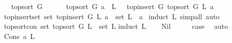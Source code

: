 \begin{isabellebody}
\ \ \ {\isachardoublequoteopen}top{\isacharunderscore}{\kern0pt}sort\ G\ {\isacharbrackleft}{\kern0pt}{\isacharbrackright}{\kern0pt}{\isacharequal}{\kern0pt}\ {\isacharbrackleft}{\kern0pt}{\isacharbrackright}{\kern0pt}\ {\isachardoublequoteclose}\isanewline
\ \ {\isacharbar}{\kern0pt}\ {\isachardoublequoteopen}top{\isacharunderscore}{\kern0pt}sort\ G\ {\isacharparenleft}{\kern0pt}a\ {\isacharhash}{\kern0pt}\ L{\isacharparenright}{\kern0pt}\ {\isacharequal}{\kern0pt}\ \ top{\isacharunderscore}{\kern0pt}insert\ G\ {\isacharparenleft}{\kern0pt}top{\isacharunderscore}{\kern0pt}sort\ G\ L{\isacharparenright}{\kern0pt}\ a{\isachardoublequoteclose}%
\isadelimdocument
%
\endisadelimdocument
%
\isatagdocument
%
\isamarkuptrue%
%
\endisatagdocument
{\isafolddocument}%
%
\isadelimdocument
%
\endisadelimdocument
{}\isamarkupfalse%
\ top{\isacharunderscore}{\kern0pt}insert{\isacharunderscore}{\kern0pt}set{\isacharcolon}{\kern0pt}\ {\isachardoublequoteopen}set\ {\isacharparenleft}{\kern0pt}top{\isacharunderscore}{\kern0pt}insert\ G\ L\ a{\isacharparenright}{\kern0pt}\ {\isacharequal}{\kern0pt}\ set\ L\ {\isasymunion}\ {\isacharbraceleft}{\kern0pt}a{\isacharbraceright}{\kern0pt}{\isachardoublequoteclose}\ \isanewline
%
\isadelimproof
%
\endisadelimproof
%
\isatagproof
{}\isamarkupfalse%
{\isacharparenleft}{\kern0pt}induct\ L{\isacharcomma}{\kern0pt}\ simp{\isacharunderscore}{\kern0pt}all{\isacharcomma}{\kern0pt}\ auto{\isacharparenright}{\kern0pt}\ \isamarkupfalse%
%
\endisatagproof
{\isafoldproof}%
%
\isadelimproof
\ \isanewline
%
\endisadelimproof
\isanewline
\isanewline
{}\isamarkupfalse%
\ top{\isacharunderscore}{\kern0pt}sort{\isacharunderscore}{\kern0pt}con{\isacharcolon}{\kern0pt}\ {\isachardoublequoteopen}set\ {\isacharparenleft}{\kern0pt}top{\isacharunderscore}{\kern0pt}sort\ G\ L{\isacharparenright}{\kern0pt}\ {\isacharequal}{\kern0pt}\ set\ L{\isachardoublequoteclose}\isanewline
%
\isadelimproof
%
\endisadelimproof
%
\isatagproof
{}\isamarkupfalse%
{\isacharparenleft}{\kern0pt}induct\ L{\isacharparenright}{\kern0pt}\isanewline
\ \ \isamarkupfalse%
\ Nil\isanewline
\ \ \isamarkupfalse%
\ \isamarkupfalse%
\ {\isacharquery}{\kern0pt}case\ \isamarkupfalse%
\ auto\isanewline
{}\isamarkupfalse%
\isanewline
\ \ \isamarkupfalse%
\ {\isacharparenleft}{\kern0pt}Cons\ a\ L{\isacharparenright}{\kern0pt}\isanewline

\end{isabellebody}
